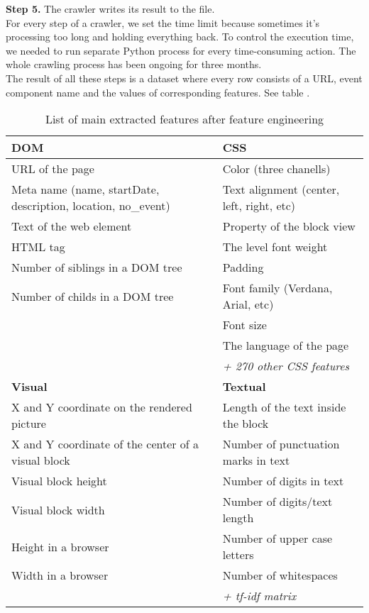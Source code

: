 \noindent\textbf{Step 5.} The crawler writes its result to the file. \\

For every step of a crawler, we set the time limit because sometimes it's processing too long and holding everything back. To control the execution time, we needed to run separate Python process for every time-consuming action. The whole crawling process has been ongoing for three months.\\

The result of all these steps is a dataset where every row consists of a URL, event component name and the values of corresponding features. See table .



\begin{table}[h]
\begin{center}
{\renewcommand{\arraystretch}{1.5}
\begin{tabular}{| p{6cm} | p{6cm} |}
\hline
\textbf{DOM}   &   \textbf{CSS}\\
\hline
URL of the page    &    Color (three chanells)\\
Meta name (name, startDate, description, location, no\_event)    &    Text alignment (center, left, right, etc)    \\
Text of the web element    &    Property of the block view    \\
HTML tag    &    The level font weight    \\
Number of siblings in a DOM tree    &    Padding    \\
Number of childs in a DOM tree    &    Font family (Verdana, Arial, etc)    \\
    &    Font size \\
    &    The language of the page \\
    
    &    \textit{+ 270 other CSS features} \\
\hline
\textbf{Visual}   &   \textbf{Textual}  \\
\hline
X and Y coordinate on the rendered picture    &    Length of the text inside the block    \\
X and Y coordinate of the center of a visual block    &    Number of punctuation marks in text    \\
Visual block height     &    Number of digits in text    \\
Visual block width        &    Number of digits/text length    \\
Height in a browser     &    Number of upper case letters    \\
Width in a browser     &    Number of whitespaces    \\

     &    \textit{+ tf-idf matrix}    \\
\hline
\end{tabular}}
\caption{List of main extracted features after feature engineering}
\label{table:featurelist}
\end{center}
\end{table}    
    

